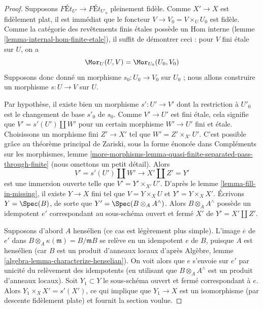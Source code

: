 \begin{proof}
Supposons $\textit{F\'Et}_{U'} \longrightarrow \textit{F\'Et}_{U'_0}$
pleinement fidèle. Comme $X' \to X$ est fidèlement plat, il est
immédiat que le foncteur $V \to V_0 = V \times_U U_0$ est fidèle.
Comme la catégorie des revêtements finis étales possède un Hom interne
(lemme \ref{lemma-internal-hom-finite-etale}),
il suffit de démontrer ceci : pour $V$ fini étale sur $U$,
on a
$$
\Mor_U(U, V) = \Mor_{U_0}(U_0, V_0)
$$
Supposons donc donné un morphisme $s_0 : U_0 \to V_0$ sur $U_0$ ; nous allons
construire un morphisme $s : U \to V$ sur $U$.

\medskip\noindent
Par hypothèse, il existe bien un morphisme $s' : U' \to V'$
dont la restriction à $U'_0$ est le changement de base $s'_0$ de $s_0$.
Comme $V' \to U'$ est fini étale, cela signifie que $V' = s'(U') \amalg W'$
pour un certain morphisme $W' \to U'$ fini et étale.
Choisissons un morphisme fini $Z' \to X'$ tel que $W' = Z' \times_{X'} U'$.
C'est possible grâce au théorème principal de Zariski, sous la forme énoncée dans
Compléments sur les morphismes, lemme
\ref{more-morphisms-lemma-quasi-finite-separated-pass-through-finite}
(nous omettons un petit détail).
Alors
$$
V' = s'(U') \amalg W' \longrightarrow X' \amalg Z' = Y'
$$
est une immersion ouverte telle que $V' = Y' \times_{X'} U'$.
D'après le lemme \ref{lemma-fill-in-missing}, il existe $Y \to X$ fini
tel que $V = Y \times_X U$ et $Y' = Y \times_X X'$.
Écrivons $Y = \Spec(B)$, de sorte que $Y' = \Spec(B \otimes_A A^\wedge)$.
Alors $B \otimes_A A^\wedge$ possède un idempotent $e'$
correspondant au sous-schéma ouvert et fermé $X'$ de $Y' = X' \amalg Z'$.

\medskip\noindent
Supposons d'abord $A$ hensélien (ce cas est légèrement plus simple). L'image $\overline{e}$
de $e'$ dans $B \otimes_A \kappa(\mathfrak m) = B/\mathfrak mB$ se relève en un
idempotent $e$ de $B$, puisque $A$ est hensélien (car $B$ est un produit d'anneaux
locaux d'après Algèbre, lemme \ref{algebra-lemma-characterize-henselian}).
On voit alors que $e$ s'envoie sur $e'$ par unicité du relèvement des idempotents
(en utilisant que $B \otimes_A A^\wedge$ est un produit d'anneaux locaux).
Soit $Y_1 \subset Y$ le sous-schéma ouvert et fermé correspondant à $e$.
Alors $Y_1 \times_X X' = s'(X')$, ce qui implique que $Y_1 \to X$ est
un isomorphisme (par descente fidèlement plate) et fournit la section voulue.


\end{proof}
